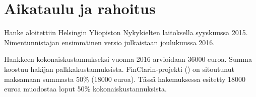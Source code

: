 \documentclass[12pt,a4paper,finnish,oneside]{article}
\begin{document}
\section{Aikataulu ja rahoitus}

Hanke aloitettiin Helsingin Yliopiston Nykykielten laitoksella syyskuussa 2015. Nimentunnistajan ensimmäinen versio julkaistaan joulukuussa 2016.

Hankkeen kokonaiskustannukseksi vuonna 2016 arvioidaan 36000 euroa. Summa koostuu hakijan palkkakustannuksista. FinClarin-projekti () on sitoutunut maksamaan summasta 50\% (18000 euroa). Tässä hakemuksessa esitetty 18000 euroa muodostaa loput 50\% kokonaiskustannuksista.





\end{document}
